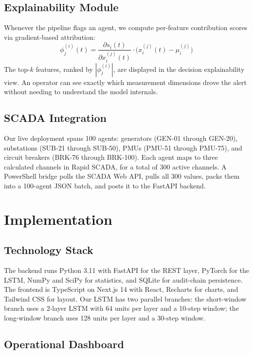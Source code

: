 \documentclass[conference]{IEEEtran}
\begin{document}
\subsection{Explainability Module}

Whenever the pipeline flags an agent, we compute per-feature contribution scores via gradient-based attribution:
\begin{equation}
\phi_j^{(i)}(t) = \frac{\partial s_i(t)}{\partial x_i^{(j)}(t)} \cdot \bigl(x_i^{(j)}(t) - \mu_i^{(j)}\bigr)
\label{eq:explain}
\end{equation}
The top-$k$ features, ranked by $|\phi_j^{(i)}|$, are displayed in the decision explainability view. An operator can see exactly which measurement dimensions drove the alert without needing to understand the model internals.

\subsection{SCADA Integration}

Our live deployment spans 100 agents: generators (GEN-01 through GEN-20), substations (SUB-21 through SUB-50), PMUs (PMU-51 through PMU-75), and circuit breakers (BRK-76 through BRK-100). Each agent maps to three calculated channels in Rapid SCADA, for a total of 300 active channels. A PowerShell bridge polls the SCADA Web API, pulls all 300 values, packs them into a 100-agent JSON batch, and posts it to the FastAPI backend.

\section{Implementation}

\subsection{Technology Stack}

The backend runs Python 3.11 with FastAPI for the REST layer, PyTorch for the LSTM, NumPy and SciPy for statistics, and SQLite for audit-chain persistence. The frontend is TypeScript on Next.js 14 with React, Recharts for charts, and Tailwind CSS for layout. Our LSTM has two parallel branches: the short-window branch uses a 2-layer LSTM with 64 units per layer and a 10-step window; the long-window branch uses 128 units per layer and a 30-step window.

\subsection{Operational Dashboard}
\end{document}
